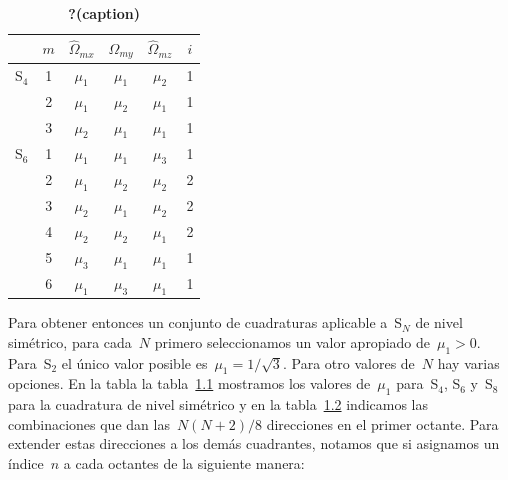 \documentclass[
  12pt,
  a4paper,
  table]{scrbook}
\theoremstyle{plain}
\theoremstyle{definition}
\theoremstyle{plain}
\theoremstyle{plain}
\theoremstyle{remark}
\begin{document}
\begin{table}

\begin{minipage}[t]{\linewidth}

{\centering 

\begin{tabular}[t]{lccccc}
\toprule
 & \(m\) & \(\hat{\Omega}_{mx}\) & \(\hat{\Omega}_{my}\) & \(\hat{\Omega}_{mz}\) & \(i\)\\
\midrule
S\(_4\) & 1 & \(\mu_1\) & \(\mu_1\) & \(\mu_2\) & 1\\
 & 2 & \(\mu_1\) & \(\mu_2\) & \(\mu_1\) & 1\\
 & 3 & \(\mu_2\) & \(\mu_1\) & \(\mu_1\) & 1\\
S\(_6\) & 1 & \(\mu_1\) & \(\mu_1\) & \(\mu_3\) & 1\\
 & 2 & \(\mu_1\) & \(\mu_2\) & \(\mu_2\) & 2\\
 & 3 & \(\mu_2\) & \(\mu_1\) & \(\mu_2\) & 2\\
 & 4 & \(\mu_2\) & \(\mu_2\) & \(\mu_1\) & 2\\
 & 5 & \(\mu_3\) & \(\mu_1\) & \(\mu_1\) & 1\\
 & 6 & \(\mu_1\) & \(\mu_3\) & \(\mu_1\) & 1\\
\bottomrule
\end{tabular}

}

\end{minipage}%

\caption{\label{tbl-mus}\textbf{?(caption)}}

\end{table}

Para obtener entonces un conjunto de cuadraturas aplicable a~S\(_N\) de
nivel simétrico, para cada~\(N\) primero seleccionamos un valor
apropiado de~\(\mu_1 > 0\). Para~S\(_2\) el único valor posible
es~\(\mu_1=1/\sqrt{3}\). Para otro valores de~\(N\) hay varias opciones.
En la tabla la tabla~\protect\hyperlink{tab:quadratureset}{1.1}
mostramos los valores de~\(\mu_1\) para~S\(_4\), S\(_6\) y~S\(_8\) para
la cuadratura de nivel simétrico y en la
tabla~\protect\hyperlink{tab:mus}{1.2} indicamos las combinaciones que
dan las~\(N(N+2)/8\) direcciones en el primer octante. Para extender
estas direcciones a los demás cuadrantes, notamos que si asignamos un
índice~\(n\) a cada octantes de la siguiente manera:
\end{document}
